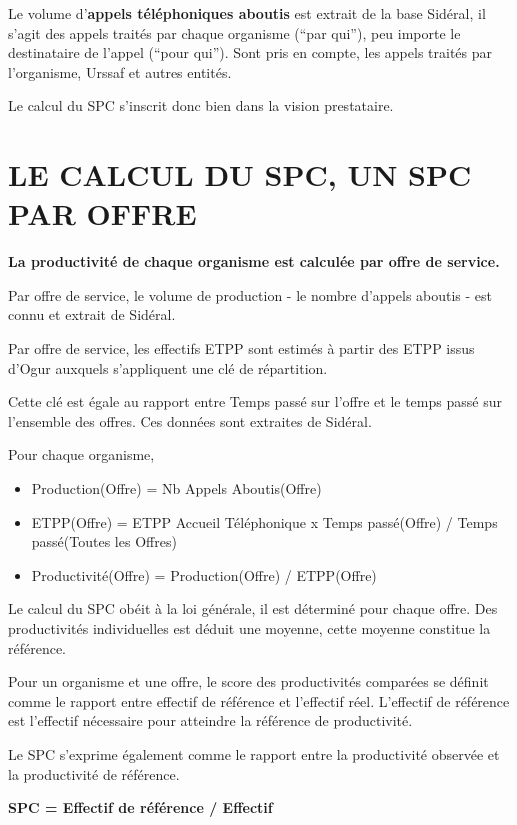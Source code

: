 \documentclass[
]{book}
\begin{document}
Le volume d'\textbf{appels téléphoniques aboutis} est extrait de la base Sidéral, il s'agit des appels traités par chaque organisme (``par qui''), peu importe le destinataire de l'appel (``pour qui'').
Sont pris en compte, les appels traités par l'organisme, Urssaf et autres entités.

Le calcul du SPC s'inscrit donc bien dans la vision prestataire.

\hypertarget{le-calcul-du-spc-un-spc-par-offre}{%
\section{LE CALCUL DU SPC, UN SPC PAR OFFRE}\label{le-calcul-du-spc-un-spc-par-offre}}

\textbf{La productivité de chaque organisme est calculée par offre de service.}

Par offre de service, le volume de production - le nombre d'appels aboutis - est connu et extrait de Sidéral.

Par offre de service, les effectifs ETPP sont estimés à partir des ETPP issus d'Ogur auxquels s'appliquent une clé de répartition.

Cette clé est égale au rapport entre Temps passé sur l'offre et le temps passé sur l'ensemble des offres. Ces données sont extraites de Sidéral.

Pour chaque organisme,

\begin{itemize}
\item
  Production(Offre) = Nb Appels Aboutis(Offre)
\item
  ETPP(Offre) = ETPP Accueil Téléphonique x Temps passé(Offre) / Temps passé(Toutes les Offres)
\item
  Productivité(Offre) = Production(Offre) / ETPP(Offre)
\end{itemize}

Le calcul du SPC obéit à la loi générale, il est déterminé pour chaque offre. Des productivités individuelles est déduit une moyenne, cette moyenne constitue la référence.

Pour un organisme et une offre, le score des productivités comparées se définit comme le rapport entre effectif de référence et l'effectif réel. L'effectif de référence est l'effectif nécessaire pour atteindre la référence de productivité.

Le SPC s'exprime également comme le rapport entre la productivité observée et la productivité de référence.

\textbf{SPC = Effectif de référence / Effectif}
\end{document}
